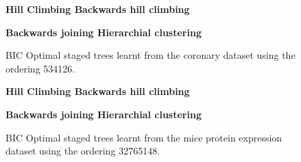 \documentclass{tufte-book}
\begin{document}
\begin{figure}
   \begin{floatrow}
   \centering
   \textbf{\hspace{10mm}Hill Climbing \hspace{50mm} Backwards hill climbing}\par\medskip
{}%
\hfill
{}
   \end{floatrow}

   
      \begin{floatrow}
   \centering
   \textbf{\hspace{5mm}Backwards joining \hspace{55mm} Hierarchial clustering}\par\medskip
{}%
\hfill
{}%
   \end{floatrow}
   \caption{BIC Optimal staged trees learnt from the coronary dataset using the ordering 534126.}
\end{figure}

\begin{figure}
   \begin{floatrow}
   \centering
   \textbf{\hspace{10mm}Hill Climbing \hspace{50mm} Backwards hill climbing}\par\medskip
{}%
\hfill
{}
   \end{floatrow}

   
      \begin{floatrow}
   \centering
   \textbf{\hspace{5mm}Backwards joining \hspace{55mm} Hierarchial clustering}\par\medskip
{}%
\hfill
{}%
   \end{floatrow}
   \caption{BIC Optimal staged trees learnt from the mice protein expression dataset using the ordering 32765148.}
\end{figure}
\end{document}
